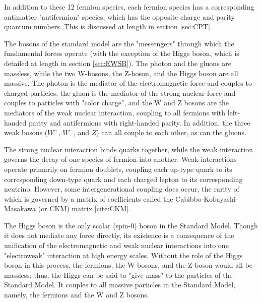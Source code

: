 In addition to these 12 fermion species, each fermion species has a corresponding antimatter "antifermion" species, which has the opposite charge and parity quantum numbers. This is discussed at length in section \ref{sec:CPT}.

The bosons of the standard model are the "messengers" through which the fundamental forces operate (with the exception of the Higgs boson, which is detailed at length in section \ref{sec:EWSB}). The photon and the gluons are massless, while the two W-bosons, the Z-boson, and the Higgs boson are all massive. The photon is the mediator of the electromagnetic force and couples to charged particles; the gluon is the mediator of the strong nuclear force and couples to particles with "color charge", and the W and Z bosons are the mediators of the weak nuclear interaction, coupling to all fermions with left-handed parity and antifermions with right-handed parity. In addition, the three weak bosons ($W^{+}$, $W^{-}$, and $Z$) can all couple to each other, as can the gluons.

The strong nuclear interaction binds quarks together, while the weak interaction governs the decay of one species of fermion into another. Weak interactions operate primarily on fermion doublets, coupling each up-type quark to its corresponding down-type quark and each charged lepton to its corresponding neutrino. However, some intergenerational coupling does occur, the rarity of which is governed by a matrix of coefficients called the Cabibbo-Kobayashi-Masakawa (or CKM) matrix \ref{cite:CKM}. 

The Higgs boson is the only scalar (spin-0) boson in the Standard Model. Though it does not mediate any force directly, its existence is a consequence of the unification of the electromagnetic and weak nuclear interactions into one "electroweak" interaction at high energy scales. Without the role of the Higgs boson in this process, the fermions, the W-bosons, and the Z-boson would all be massless; thus, the Higgs can be said to "give mass" to the particles of the Standard Model. It couples to all massive particles in the Standard Model, namely, the fermions and the W and Z bosons.

